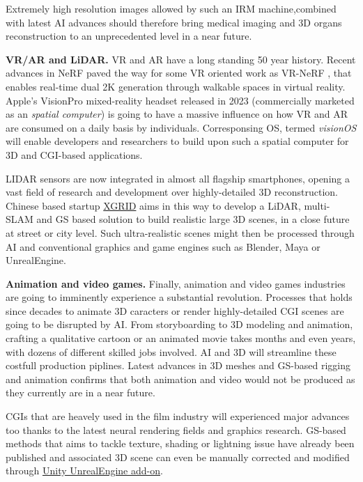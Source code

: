 Extremely high resolution images allowed by such an IRM machine,combined with latest \ac{AI} advances should therefore bring medical imaging and 3D organs reconstruction to an unprecedented level in a near future. 

\noindent \textbf{VR/AR and LiDAR.} \ac{VR} and \ac{AR} have a long standing 50 year history. Recent advances in \ac{NeRF} paved the way for some VR oriented work as VR-NeRF \citep{xu2023vr}, that enables real-time dual 2K generation through walkable spaces in virtual reality. Apple's VisionPro mixed-reality headset released in 2023 (commercially marketed as an \textit{spatial computer}) is going to have a massive influence on how \ac{VR} and \ac{AR} are consumed on a daily basis by individuals. Corresponsing OS, termed \textit{visionOS} will enable developers and researchers to build upon such a {spatial computer} for 3D and \ac{CGI}-based applications.

LIDAR sensors are now integrated in almost all flagship smartphones, opening a vast field of research and development over highly-detailed 3D reconstruction. Chinese based startup \href{https://www.xgrids.com/}{XGRID} aims in this way to develop a LiDAR, multi-SLAM and \ac{GS} based solution to build realistic large 3D scenes, in a close future at street or city level. Such ultra-realistic scenes might then be processed through \ac{AI} and conventional graphics and game engines such as Blender, Maya or UnrealEngine. 

\noindent \textbf{Animation and video games.} Finally, animation and video games industries are going to imminently experience a substantial revolution. Processes that holds since decades to animate 3D caracters or render highly-detailed \ac{CGI} scenes are going to be disrupted by \ac{AI}. From storyboarding to 3D modeling and animation, crafting a qualitative cartoon or an animated movie takes months and even years, with dozens of different skilled jobs involved. \ac{AI} and 3D will streamline these costfull production piplines. Latest advances in 3D meshes and \ac{GS}-based rigging and animation \citep{qian2023gaussianavatars,li2024animatablegaussians} confirms that both animation and video would not be produced as they currently are in a near future. 

\ac{CGI}s that are heavely used in the film industry will experienced major advances too thanks to the latest neural rendering fields and graphics research. \ac{GS}-based methods that aims to tackle texture, shading or lightning issue have already been published \citep{jiang2023gaussianshader,wu2024deferredgs} and associated 3D scene can even be manually corrected and modified through \href{https://github.com/aras-p/UnityGaussianSplatting/}{Unity UnrealEngine add-on}. 


